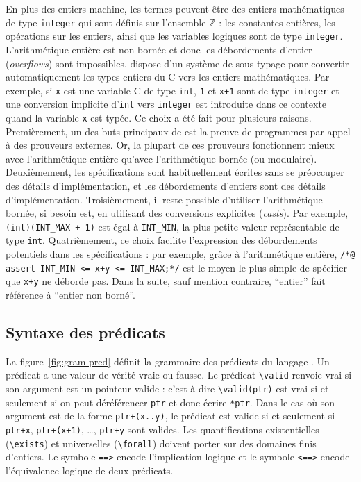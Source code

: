 En plus des entiers machine, les termes \eacsl peuvent être des entiers
mathématiques de type \lstinline{integer} qui sont définis sur l'ensemble
$\mathbb{Z}$ : les constantes entières, les
opérations sur les entiers, ainsi que les variables logiques sont de type
\lstinline{integer}.
L'arithmétique entière est non bornée et donc les débordements d'entier
(\textit{overflows}) sont impossibles.
\eacsl dispose d'un système de sous-typage pour convertir automatiquement les
types entiers du C vers les entiers mathématiques.
Par exemple, si \lstinline{x} est une variable C de type \lstinline{int},
\lstinline{1} et \lstinline{x+1} sont de type \lstinline{integer} et une
conversion implicite d'\lstinline{int} vers \lstinline{integer} est introduite
dans ce contexte quand la variable \lstinline{x} est typée.
Ce choix a été fait pour plusieurs raisons.
Premièrement, un des buts principaux de \framac est la preuve de programmes par
appel à des prouveurs externes.
Or, la plupart de ces prouveurs fonctionnent mieux
avec l'arithmétique entière qu'avec l'arithmétique bornée (ou modulaire).
Deuxièmement, les spécifications sont habituellement écrites sans se préoccuper
des détails d'implémentation, et les débordements d'entiers sont des détails
d'implémentation.
Troisièmement, il reste possible d'utiliser l'arithmétique bornée, si besoin
est, en utilisant des conversions explicites (\textit{casts}).
Par exemple, \lstinline{(int)(INT_MAX + 1)} est égal à \lstinline{INT_MIN}, la
plus petite valeur représentable de type \lstinline{int}.
Quatrièmement, ce choix facilite l'expression des débordements potentiels dans
les spécifications : par exemple, grâce à l'arithmétique entière,
\lstinline{/*@ assert INT_MIN <= x+y <= INT_MAX;*/} est le moyen le plus simple
de spécifier que \lstinline{x+y} ne déborde pas.
Dans la suite, sauf mention contraire, ``entier'' fait référence à
``entier non borné''.


\subsection{Syntaxe des prédicats \eacsl}



La figure~\ref{fig:gram-pred} définit la grammaire des prédicats du langage
\eacsl.
Un prédicat a une valeur de vérité vraie ou fausse.
Le prédicat \lstinline'\valid' renvoie vrai si son argument est un pointeur
valide : c'est-à-dire \lstinline'\valid(ptr)' est vrai si et seulement si
on peut déréférencer \lstinline'ptr' et donc écrire \lstinline'*ptr'.
Dans le cas où son argument est de la forme \lstinline'ptr+(x..y)', le prédicat
est valide si et seulement si \lstinline'ptr+x', \lstinline'ptr+(x+1)', \ldots,
\lstinline'ptr+y' sont valides.
Les quantifications existentielles (\lstinline'\exists') et universelles
(\lstinline'\forall') doivent porter sur des domaines finis d'entiers.
Le symbole \lstinline'==>' encode l'implication logique et le symbole
\lstinline'<==>' encode l'équivalence logique de deux prédicats.


